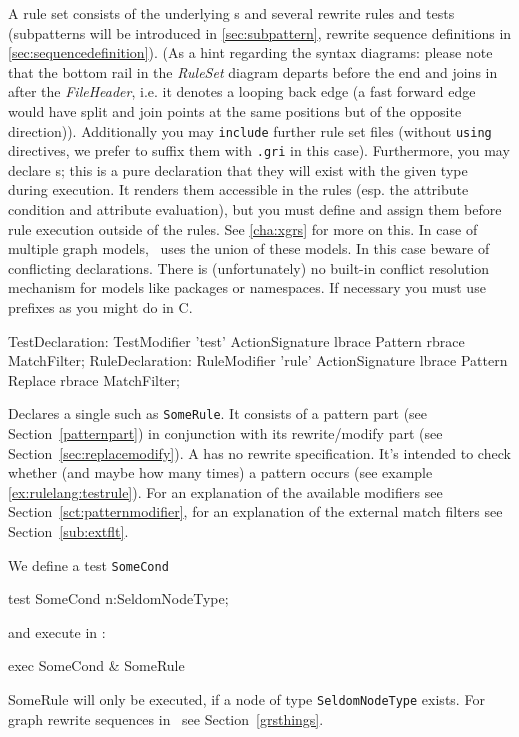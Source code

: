 A rule set consists of the underlying s and several rewrite rules and tests (subpatterns will be introduced in \ref{sec:subpattern}, rewrite sequence definitions in \ref{sec:sequencedefinition}).
(As a hint regarding the syntax diagrams: please note that the bottom rail in the \emph{RuleSet} diagram departs before the end and joins in after the \emph{FileHeader}, i.e. it denotes a looping back edge (a fast forward edge would have split and join points at the same positions but of the opposite direction)).
Additionally you may \texttt{include} further rule set files (without \texttt{using} directives, we prefer to suffix them with \texttt{.gri} in this case).
Furthermore, you may declare s; this is a pure declaration that they will exist with the given type during execution. It renders them accessible in the rules (esp. the attribute condition and attribute evaluation), but you must define and assign them  before rule execution outside of the rules. See \ref{cha:xgrs} for more on this.
In case of multiple graph models, \GrG\ uses the union of these models. In this case beware of conflicting declarations.
There is (unfortunately) no built-in conflict resolution mechanism for models like packages or namespaces.
If necessary you must use prefixes as you might do in C.

\begin{rail}
  TestDeclaration: TestModifier 'test' ActionSignature lbrace Pattern rbrace MatchFilter;
  RuleDeclaration: RuleModifier 'rule' ActionSignature lbrace Pattern Replace rbrace MatchFilter;
\end{rail}
Declares a single  such as \texttt{SomeRule}.
It consists of a pattern part (see Section~\ref{patternpart}) in conjunction with its rewrite/modify part (see Section~\ref{sec:replacemodify}).
A  has no rewrite specification.
It's intended to check whether (and maybe how many times) a pattern occurs (see example \ref{ex:rulelang:testrule}).
For an explanation of the available modifiers see Section~\ref{sct:patternmodifier},
for an explanation of the external match filters see Section~\ref{sub:extflt}.


\begin{example}
\label{ex:rulelang:testrule}
We define a test \texttt{SomeCond}
\begin{grgen}
test SomeCond {
  n:SeldomNodeType;
}
\end{grgen}
and execute in \GrShell:
\begin{grshell}
  exec SomeCond & SomeRule
\end{grshell}
SomeRule will only be executed, if a node of type \texttt{SeldomNodeType} exists.
For graph rewrite sequences in \GrShell\ see Section~\ref{grsthings}.
\end{example}

